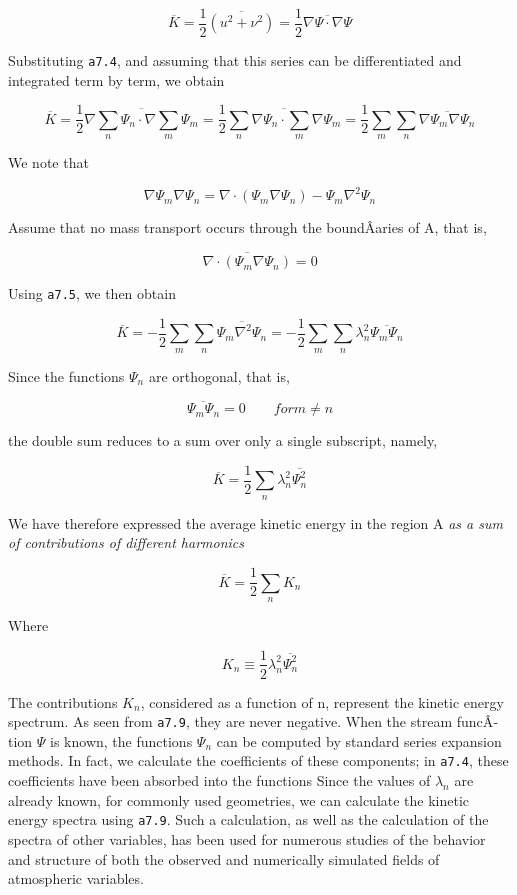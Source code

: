 {\[\overline{K} = \frac{1}{2}\overline{( u^{2} + \nu^{2} ) } = \frac{1}{2}\overline{\nabla\Psi\cdot\nabla\Psi}\]}

Substituting \texttt{a7.4}, and assuming that this series can be
differentiated and integrated term by term, we obtain

\[\overline{K} = \frac{1}{2}\overline{ \nabla \sum_n\Psi_n\cdot\nabla\sum_m \Psi_m } 
= \frac{1}{2}\overline{  \sum_n\nabla\Psi_n\cdot\sum_m \nabla\Psi_m }  
= \frac{1}{2}\sum_m\sum_n \overline{ \nabla\Psi_m \nabla\Psi_n }\]

We note that

\[\nabla\Psi_m \nabla\Psi_n =\nabla \cdot \left( \Psi_m\nabla\Psi_n \right) - \Psi_m\nabla^2\Psi_n\]

Assume that no mass transport occurs through the boundÂ­aries of A, that
is,

\[\overline{\nabla\cdot\left( \Psi_{m}\nabla\Psi_{n} \right)} = 0\]

Using \texttt{a7.5}, we then obtain

\[\overline{K} = -\frac{1}{2}\sum_m\sum_n \overline{ \Psi_m \nabla^2\Psi_n }
= -\frac{1}{2}\sum_m\sum_n \lambda_n^2\overline{ \Psi_m \Psi_n }\]

Since the functions \(\Psi_{n}\) are orthogonal, that is,

\[\overline{ \Psi_m \Psi_n } = 0 \qquad for m \neq n\]

the double sum reduces to a sum over only a single subscript, namely,

\[\overline{K} = \frac{1}{2}\sum_{n}\lambda_{n}^{2}\overline{\Psi_n^2}\]

We have therefore expressed the average kinetic energy in the region A
\emph{as a sum of contributions of different harmonics}

{\[\overline{K} = \frac{1}{2}\sum_{n}K_n\]}

Where

{\[K_{n} \equiv \frac{1}{2}\lambda_{n}^{2}\overline{\Psi_n^2}\]}

The contributions \(K_{n}\), considered as a function of n, represent
the kinetic energy spectrum. As seen from \texttt{a7.9}, they are never
negative. When the stream funcÂ­tion \(\Psi\) is known, the functions
\(\Psi_{n}\) can be computed by standard series expansion methods. In
fact, we calculate the coefficients of these components; in
\texttt{a7.4}, these coefficients have been absorbed into the functions
Since the values of \(\lambda_{n}\) are already known, for commonly used
geometries, we can calculate the kinetic energy spectra using
\texttt{a7.9}. Such a calculation, as well as the calculation of the
spectra of other variables, has been used for numerous studies of the
behavior and structure of both the observed and numerically simulated
fields of atmospheric variables.


